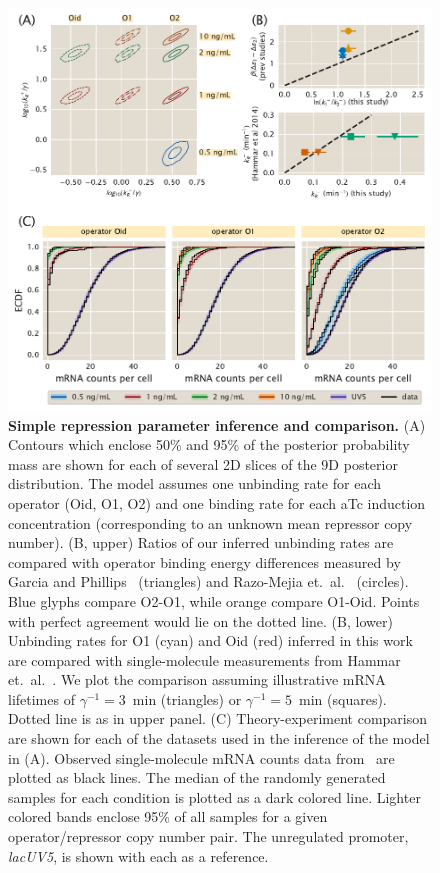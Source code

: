 \begin{figure}%
\centering
\includegraphics[width=\textwidth]{../../figures/main/fig04.pdf}
\caption{\textbf{Simple repression parameter inference and comparison.}
(A) Contours which enclose 50\% and 95\% of the posterior probability mass are
shown for each of several 2D slices of the 9D posterior distribution. The model
assumes one unbinding rate for each operator (Oid, O1, O2) and one binding rate
for each aTc induction concentration (corresponding to an unknown mean repressor
copy number).
(B, upper) Ratios of our inferred unbinding rates are
compared with operator binding energy differences measured by Garcia and
Phillips~\cite{Garcia2011a} (triangles) and Razo-Mejia et.\
al.~\cite{Razo-Mejia2018} (circles). Blue glyphs compare O2-O1, while orange
compare O1-Oid. Points with perfect agreement would lie on the dotted line.
(B, lower) Unbinding rates for O1 (cyan) and Oid (red)
inferred in this work are compared with single-molecule measurements
from Hammar et.\ al.~\cite{Hammar2014}. We plot the comparison assuming illustrative mRNA
lifetimes of $\gamma^{-1}=3$~min (triangles) or $\gamma^{-1}=5$~min
(squares). Dotted line is as in upper panel.
(C) Theory-experiment comparison are shown for each of the datasets
used in the inference of the model in (A). Observed single-molecule mRNA counts
data from~\cite{Jones2014} are plotted as black lines. The median of the randomly
generated samples for each condition is plotted as a dark colored line. Lighter
colored bands enclose 95\% of all samples for a given operator/repressor copy
number pair.
The unregulated promoter, \textit{lacUV5}, is shown with each as a reference.}
\label{fig4:repressed_post_full}
\end{figure}

